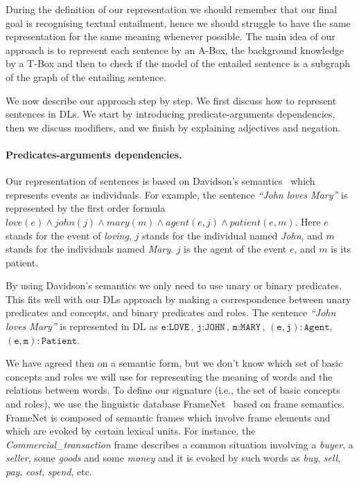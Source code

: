 \documentclass{esslli}
\newcommand{\dl}[1]{\texttt{#1}}
\newcommand{\dd}{{:}}
\begin{document}
During the definition of our representation we should remember that
our final goal is recognising textual entailment, hence we should
struggle to have the same representation for the same meaning whenever
possible. The main idea of our approach is to represent each sentence
by an A-Box, the background knowledge by a T-Box and then to check if
the model of the entailed sentence is a subgraph of the graph of the
entailing sentence.

We now describe our approach step by step. We first discuss how to
represent sentences in DLs. We start by introducing predicate-arguments
dependencies, then we discuss modifiers, and we finish by explaining
adjectives and negation.


\paragraph{Predicates-arguments dependencies.}
Our representation of sentences is based on Davidson's
semantics~\cite{Davidson80} which represents events as individuals. For
example, the sentence \emph{``John loves Mary''} is represented by the
first order formula $love(e) \wedge john(j) \wedge  mary(m) \wedge
agent(e,j) \wedge patient(e,m)$. Here $e$ stands for the event of
\emph{loving}, $j$ stands for the individual named \emph{John}, and
$m$ stands for the individuals named \emph{Mary}. $j$ is the agent
of the event $e$, and $m$ is its patient.


By using Davidson's semantics we only need to use unary or binary
predicates. This fits well with our DLs approach by making a
correspondence between unary predicates and concepts, and binary
predicates and roles. The sentence \emph{``John loves Mary''} is
represented in DL as $\dl{e} \dd \dl{LOVE}$, $\dl{j} \dd \dl{JOHN}$,
$\dl{m} \dd \dl{MARY}$, $(\dl{e},\dl{j}) \dd \dl{Agent}$,
$(\dl{e},\dl{m}) \dd \dl{Patient}$.


We have agreed then on a semantic form, but we don't know which set of
basic concepts and roles we will use for representing the meaning of
words and the relations between words. To define our signature (i.e.,
the set of basic concepts and roles), we use the linguistic database
FrameNet~\cite{baker98berkeley} based on frame semantics. FrameNet is
composed of semantic frames which involve frame elements and which are
evoked by certain lexical units. For instance, the
\emph{Commercial\_transaction} frame describes a common situation
involving a \emph{buyer}, a \emph{seller}, some \emph{goods} and some
\emph{money} and it is evoked by such words as \emph{buy},
\emph{sell}, \emph{pay}, \emph{cost}, \emph{spend}, etc.
\end{document}
